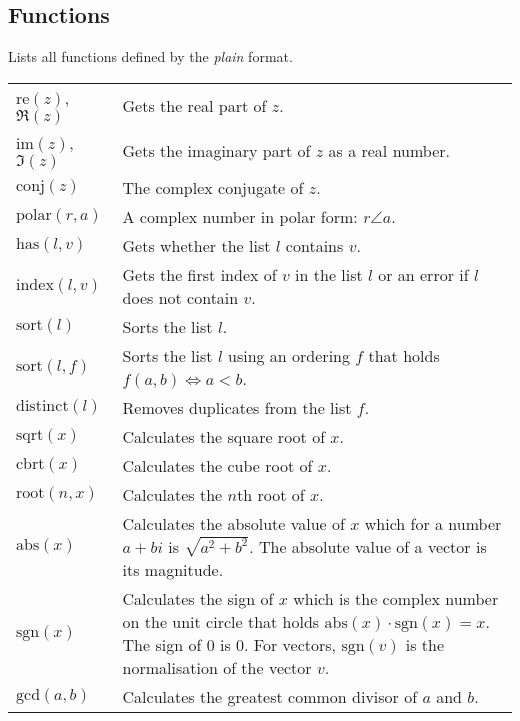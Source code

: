 \documentclass[10pt]{article}
\newcommand{\tabgap}{\vspace{3mm}\\}
\begin{document}
    \subsection{Functions}
    Lists all functions defined by the \textit{plain} format.
    \begin{longtable}{p{}p{}}
        $ \mathrm{re}(z) $, $ \Re(z) $             & Gets the real part of $ z $. \\
        $ \mathrm{im}(z) $, $ \Im(z) $             & Gets the imaginary part of $ z $ as a real number. \\
        $ \mathrm{conj}(z) $                       & The complex conjugate of $ z $. \\
        $ \mathrm{polar}(r, a) $                   & A complex number in polar form: $ r \angle a $. \tabgap
        $ \mathrm{has}(l, v) $                     & Gets whether the list $ l $ contains $ v $. \\
        $ \mathrm{index}(l, v) $                   & Gets the first index of $ v $ in the list $ l $ or an error if $ l $ does not contain $ v $. \\
        $ \mathrm{sort}(l) $                       & Sorts the list $ l $. \\
        $ \mathrm{sort}(l, f) $                    & Sorts the list $ l $ using an ordering $ f $ that holds $ f(a, b) \iff a < b $. \\
        $ \mathrm{distinct}(l) $                   & Removes duplicates from the list $ f $. \tabgap
        $ \mathrm{sqrt}(x) $                       & Calculates the square root of $ x $. \\
        $ \mathrm{cbrt}(x) $                       & Calculates the cube root of $ x $. \\
        $ \mathrm{root}(n, x) $                    & Calculates the $ n $th root of $ x $. \tabgap
        $ \mathrm{abs}(x) $                        & Calculates the absolute value of $ x $ which for a number $ a + bi$ is $ \sqrt{a^2 + b^2} $. The absolute value of a vector is its magnitude. \\
        $ \mathrm{sgn}(x) $                        & Calculates the sign of $ x $ which is the complex number on the unit circle that holds $ \mathrm{abs}(x) \cdot \mathrm{sgn}(x) = x $. The sign of $ 0 $ is $ 0 $. For vectors, $ \mathrm{sgn}(v) $ is the normalisation of the vector $ v $. \tabgap
        $ \mathrm{gcd}(a, b) $                     & Calculates the greatest common divisor of $ a $ and $ b $. \\

\end{longtable}
\end{document}
